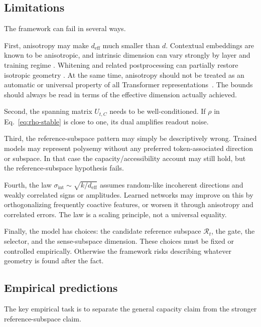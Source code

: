 \documentclass[
  aps,
  reprint,
  superscriptaddress,
  floatfix,
  nofootinbib,
  longbibliography
]{revtex4-2}
\newcommand{\deff}{d_{\mathrm{eff}}}
\newcommand{\sint}{\sigma_{\mathrm{int}}}
\begin{document}
\subsection{Limitations}
\label{sec:limitations}

The framework can fail in several ways.

First, anisotropy may make $\deff$ much smaller than $d$.
Contextual embeddings are known to be anisotropic, and intrinsic
dimension can vary strongly by layer and training regime
\cite{ethayarajh2019,gao2019representation,mu2018allbutthetop,razzhigaev2024shape}. Whitening and
related postprocessing can partially restore isotropic geometry
\cite{gao2019representation,mu2018allbutthetop,su2021whitening}. At the same time, anisotropy should not
be treated as an automatic or universal property of all Transformer
representations~\cite{machina2024anisotropy}. The bounds should always
be read in terms of the effective dimension actually achieved.

Second, the spanning matrix $U_{t,C}$ needs to be well-conditioned. If
$\rho$ in Eq.~\eqref{eq:rho-stable} is close to one, its dual amplifies
readout noise.

Third, the reference-subspace pattern may simply be descriptively wrong. Trained
models may represent polysemy without any preferred token-associated
direction or subspace. In that case the capacity/accessibility
account may still hold, but the reference-subspace hypothesis fails.

Fourth, the law $\sint\sim\sqrt{k/\deff}$ assumes random-like
incoherent directions and weakly correlated signs or amplitudes.
Learned networks may improve on this by orthogonalizing frequently
coactive features, or worsen it through anisotropy and correlated
errors. The law is a scaling principle, not a universal equality.

Finally, the model has choices: the candidate reference subspace
$\mathcal R_t$, the gate, the selector, and the sense-subspace dimension.
These choices must be fixed or controlled empirically. Otherwise the
framework risks describing whatever geometry is found after the fact.

\subsection{Empirical predictions}
\label{sec:predictions}

The key empirical task is to separate the general capacity claim from
the stronger reference-subspace claim.
\end{document}
